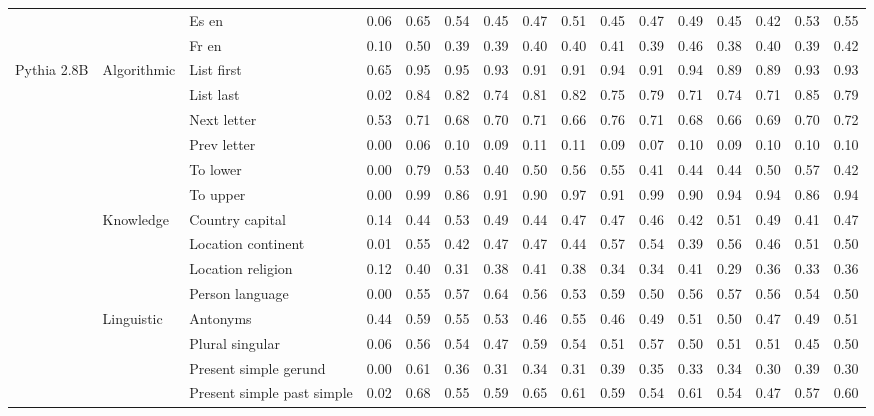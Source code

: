 \begin{center}
\begin{longtable}{lllrrrrrrrrrrrrr}
 &  & Es en & 0.06 & 0.65 & 0.54 & 0.45 & 0.47 & 0.51 & 0.45 & 0.47 & 0.49 & 0.45 & 0.42 & 0.53 & 0.55 \\
 &  & Fr en & 0.10 & 0.50 & 0.39 & 0.39 & 0.40 & 0.40 & 0.41 & 0.39 & 0.46 & 0.38 & 0.40 & 0.39 & 0.42 \\
\cline{1-16} \cline{2-16}
\multirow[t]{18}{*}{Pythia 2.8B} & \multirow[t]{6}{*}{Algorithmic} & List first & 0.65 & 0.95 & 0.95 & 0.93 & 0.91 & 0.91 & 0.94 & 0.91 & 0.94 & 0.89 & 0.89 & 0.93 & 0.93 \\
 &  & List last & 0.02 & 0.84 & 0.82 & 0.74 & 0.81 & 0.82 & 0.75 & 0.79 & 0.71 & 0.74 & 0.71 & 0.85 & 0.79 \\
 &  & Next letter & 0.53 & 0.71 & 0.68 & 0.70 & 0.71 & 0.66 & 0.76 & 0.71 & 0.68 & 0.66 & 0.69 & 0.70 & 0.72 \\
 &  & Prev letter & 0.00 & 0.06 & 0.10 & 0.09 & 0.11 & 0.11 & 0.09 & 0.07 & 0.10 & 0.09 & 0.10 & 0.10 & 0.10 \\
 &  & To lower & 0.00 & 0.79 & 0.53 & 0.40 & 0.50 & 0.56 & 0.55 & 0.41 & 0.44 & 0.44 & 0.50 & 0.57 & 0.42 \\
 &  & To upper & 0.00 & 0.99 & 0.86 & 0.91 & 0.90 & 0.97 & 0.91 & 0.99 & 0.90 & 0.94 & 0.94 & 0.86 & 0.94 \\
\cline{2-16}
 & \multirow[t]{4}{*}{Knowledge} & Country capital & 0.14 & 0.44 & 0.53 & 0.49 & 0.44 & 0.47 & 0.47 & 0.46 & 0.42 & 0.51 & 0.49 & 0.41 & 0.47 \\
 &  & Location continent & 0.01 & 0.55 & 0.42 & 0.47 & 0.47 & 0.44 & 0.57 & 0.54 & 0.39 & 0.56 & 0.46 & 0.51 & 0.50 \\
 &  & Location religion & 0.12 & 0.40 & 0.31 & 0.38 & 0.41 & 0.38 & 0.34 & 0.34 & 0.41 & 0.29 & 0.36 & 0.33 & 0.36 \\
 &  & Person language & 0.00 & 0.55 & 0.57 & 0.64 & 0.56 & 0.53 & 0.59 & 0.50 & 0.56 & 0.57 & 0.56 & 0.54 & 0.50 \\
\cline{2-16}
 & \multirow[t]{4}{*}{Linguistic} & Antonyms & 0.44 & 0.59 & 0.55 & 0.53 & 0.46 & 0.55 & 0.46 & 0.49 & 0.51 & 0.50 & 0.47 & 0.49 & 0.51 \\
 &  & Plural singular & 0.06 & 0.56 & 0.54 & 0.47 & 0.59 & 0.54 & 0.51 & 0.57 & 0.50 & 0.51 & 0.51 & 0.45 & 0.50 \\
 &  & Present simple gerund & 0.00 & 0.61 & 0.36 & 0.31 & 0.34 & 0.31 & 0.39 & 0.35 & 0.33 & 0.34 & 0.30 & 0.39 & 0.30 \\
 &  & Present simple past simple & 0.02 & 0.68 & 0.55 & 0.59 & 0.65 & 0.61 & 0.59 & 0.54 & 0.61 & 0.54 & 0.47 & 0.57 & 0.60 \\

\end{longtable}
\end{center}

